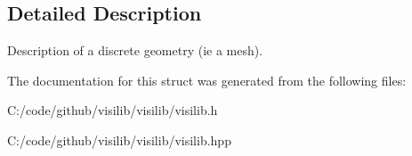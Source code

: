 \subsection{Detailed Description}
Description of a discrete geometry (ie a mesh). 

The documentation for this struct was generated from the following files\+:\begin{DoxyCompactItemize}
\item 
C\+:/code/github/visilib/visilib/visilib.\+h\item 
C\+:/code/github/visilib/visilib/visilib.\+hpp\end{DoxyCompactItemize}
